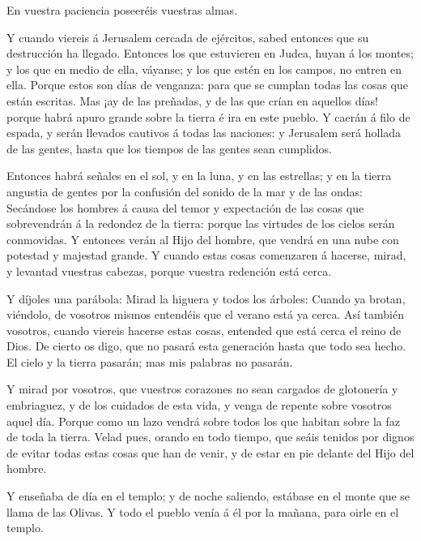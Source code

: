  En vuestra paciencia poseeréis vuestras almas.

 Y cuando viereis á Jerusalem cercada de ejércitos, sabed
entonces que su destrucción ha llegado.  Entonces los que
estuvieren en Judea, huyan á los montes; y los que en medio de ella,
váyanse; y los que estén en los campos, no entren en ella. 
Porque estos son días de venganza: para que se cumplan todas las cosas
que están escritas.  Mas ¡ay de las preñadas, y de las que
crían en aquellos días! porque habrá apuro grande sobre la tierra é ira
en este pueblo.  Y caerán á filo de espada, y serán
llevados cautivos á todas las naciones: y Jerusalem será hollada de las
gentes, hasta que los tiempos de las gentes sean cumplidos.

 Entonces habrá señales en el sol, y en la luna, y en las
estrellas; y en la tierra angustia de gentes por la confusión del sonido
de la mar y de las ondas:  Secándose los hombres á causa
del temor y expectación de las cosas que sobrevendrán á la redondez de
la tierra: porque las virtudes de los cielos serán conmovidas.
 Y entonces verán al Hijo del hombre, que vendrá en una
nube con potestad y majestad grande.  Y cuando estas cosas
comenzaren á hacerse, mirad, y levantad vuestras cabezas, porque vuestra
redención está cerca.

 Y díjoles una parábola: Mirad la higuera y todos los
árboles:  Cuando ya brotan, viéndolo, de vosotros mismos
entendéis que el verano está ya cerca.  Así también
vosotros, cuando viereis hacerse estas cosas, entended que está cerca el
reino de Dios.  De cierto os digo, que no pasará esta
generación hasta que todo sea hecho.  El cielo y la tierra
pasarán; mas mis palabras no pasarán.

 Y mirad por vosotros, que vuestros corazones no sean
cargados de glotonería y embriaguez, y de los cuidados de esta vida, y
venga de repente sobre vosotros aquel día.  Porque como un
lazo vendrá sobre todos los que habitan sobre la faz de toda la tierra.
 Velad pues, orando en todo tiempo, que seáis tenidos por
dignos de evitar todas estas cosas que han de venir, y de estar en pie
delante del Hijo del hombre.

 Y enseñaba de día en el templo; y de noche saliendo,
estábase en el monte que se llama de las Olivas.  Y todo el
pueblo venía á él por la mañana, para oirle en el templo.

